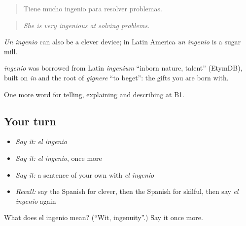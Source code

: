 \begin{quote}
Tiene mucho ingenio para resolver problemas.
\end{quote}

\begin{quote}
\emph{She is very ingenious at solving problems.}
\end{quote}

\emph{Un ingenio} can also be a clever device; in Latin America \emph{un ingenio} is a sugar mill.

\begin{cousinweb}
\emph{ingenio} was borrowed from Latin \emph{ingenium} \textquotedblleft{}inborn nature, talent\textquotedblright{} (EtymDB), built on \emph{in} and the root of \emph{gignere} \textquotedblleft{}to beget\textquotedblright{}: the gifts you are born with.
\end{cousinweb}

\begin{grammarlens}[title={What you've built}]
One more word for telling, explaining and describing at B1.
\end{grammarlens}

\subsection*{Your turn}
\begin{itemize}
\raggedright
  \item \emph{Say it:} \emph{el ingenio}
  \item \emph{Say it:} \emph{el ingenio}, once more
  \item \emph{Say it:} a sentence of your own with \emph{el ingenio}
  \item \emph{Recall:} say the Spanish for clever, then the Spanish for skilful, then say \emph{el ingenio} again
\end{itemize}

\begin{tcolorbox}[breakable,colback=teal!4,colframe=teal!35!black,title={Before you move on}]
What does el ingenio mean? (\textquotedblleft{}Wit, ingenuity\textquotedblright{}.) Say it once more.
\end{tcolorbox}
